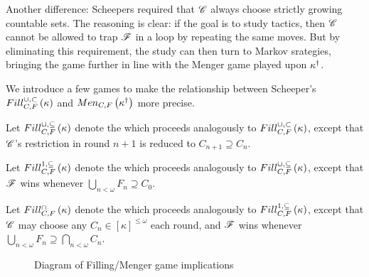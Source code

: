 Another difference: Scheepers required that $\mathscr{C}$ always choose strictly
growing countable sets. The reasoning is clear: if the goal is to study tactics,
then $\mathscr{C}$ cannot be allowed to trap $\mathscr{F}$ in a loop by repeating the same
moves. But by eliminating this requirement, the study can then turn to Markov
srategies, bringing the game further in line with the Menger game played upon
$\kappa^\dagger$.

We introduce a few games to make the relationship between Scheeper's
$Fill^{\cup,\subset}_{C,F}\left({\kappa}\right)$ and $Men_{C,F}\left({\kappa^\dagger}\right)$ more precise.

\begin{game}
  Let $Fill^{\cup,\subseteq}_{C,F}\left({\kappa}\right)$ denote the
   which proceeds analogously
  to $Fill^{\cup,\subset}_{C,F}\left({\kappa}\right)$, except that $\mathscr{C}$'s restriction in round $n+1$
  is reduced to $C_{n+1}\supseteq C_n$.
\end{game}

\begin{game}
  Let $Fill^{1,\subseteq}_{C,F}\left({\kappa}\right)$ denote the
   which proceeds analogously
  to $Fill^{\cup,\subseteq}_{C,F}\left({\kappa}\right)$, except that $\mathscr{F}$ wins whenever
  $\bigcup_{n<\omega}F_n\supseteq C_0$.
\end{game}

\begin{game}
  Let $Fill^{\cap}_{C,F}\left({\kappa}\right)$ denote the
   which proceeds analogously
  to $Fill^{1,\subseteq}_{C,F}\left({\kappa}\right)$, except that $\mathscr{C}$ may choose any
  $C_n\in[\kappa]^{\leq\omega}$ each round, and $\mathscr{F}$ wins whenever
  $\bigcup_{n<\omega}F_n\supseteq\bigcap_{n<\omega}C_n$.
\end{game}

\begin{figure}[h]
\begin{center}
\end{center}
\caption{Diagram of Filling/Menger game implications}
\label{fillingGamesDiagram}
\end{figure}

